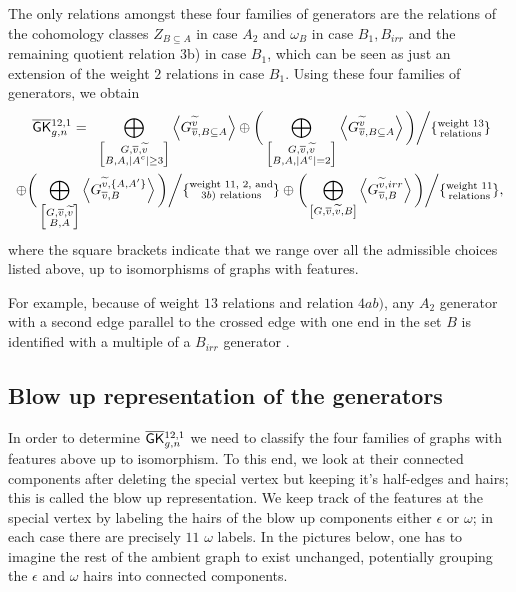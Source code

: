 The only relations amongst these four families of generators are the relations of the cohomology classes $Z_{B\subseteq A}$ in case $A_2$ and $\omega_B$ in case $B_1,B_{irr}$ and the remaining quotient relation 3b) in case $B_1$, which can be seen as just an extension of the weight $2$ relations in case $B_1$. Using these four families of generators, we obtain
\begin{multline}
    \; \overline{\mathsf{GK}}{}^{12,1}_{g,n} = \;\;
    \bigoplus_{\left[\substack{G,\overline{v},\widetilde{v} \\ B,A,|A^c|\geq 3} \right]} \left< G_{\overline{v},B\subseteq A}^{\widetilde{v}} \right>
    \oplus \bigg( \bigoplus_{\left[\substack{G,\overline{v},\widetilde{v} \\ B,A,|A^c|=2 }\right]} \left< G_{\overline{v},B\subseteq A}^{\widetilde{v}} \right> \bigg) \bigg/ \{\substack{\text{weight 13}\\ \text{relations}}\} \\
    \oplus \bigg( \bigoplus_{\left[\substack{G,\overline{v},\widetilde{v} \\ B, A}\right]} \left<G_{\overline{v},B}^{\widetilde{v},\{A,A'\}} \right> \bigg) \bigg/ \{\substack{\text{weight 11, 2, and}\\ \text{$3b)$ relations}}\}
    \oplus \bigg( \bigoplus_{\left[G,\overline{v},\widetilde{v},B\right]} \left< G_{\overline{v},B}^{\widetilde{v},irr} \right> \bigg) \bigg/ \{\substack{\text{weight 11}\\ \text{relations}}\},
\end{multline}
where the square brackets indicate that we range over all the admissible choices listed above, up to isomorphisms of graphs with features.

For example, because of weight $13$ relations and relation $4ab)$, any $A_2$ generator with a second edge parallel to the crossed edge with one end in the set $B$ is identified with a multiple of a $B_{irr}$ generator \cite[Remark 2.5]{CLPW2}.


\subsection{Blow up representation of the generators}
In order to determine $\overline{\mathsf{GK}}{}_{g,n}^{12,1}$ we need to classify the four families of graphs with features above up to isomorphism. To this end, we look at their connected components after deleting the special vertex but keeping it's half-edges and hairs; this is called the blow up representation. We keep track of the features at the special vertex by labeling the hairs of the blow up components either $\epsilon$ or $\omega$; in each case there are precisely $11$ $\omega$ labels. In the pictures below, one has to imagine  the rest of the ambient graph to exist unchanged, potentially grouping the $\epsilon$ and $\omega$ hairs into connected components.

